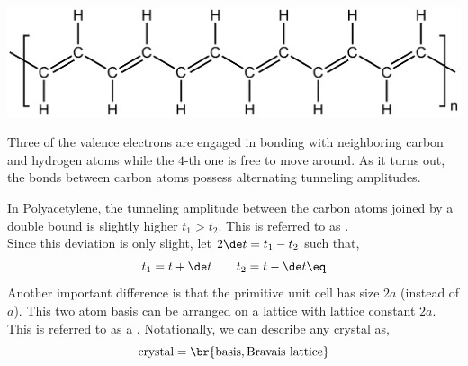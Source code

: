\documentclass{article}
\begin{document}
\begin{center}
    \includegraphics[width=\linewidth]{figures/polyacetylene.png}
\end{center}

Three of the valence electrons are engaged in bonding with neighboring carbon and hydrogen atoms while the $4$-th one is free to move around. As it turns out, the bonds between carbon atoms possess alternating tunneling amplitudes.

\begin{center}
\end{center}

In Polyacetylene, the tunneling amplitude between the carbon atoms joined by a double bound is slightly higher $t_1 > t_2$. This is referred to as . \\

Since this deviation is only slight, let $2\de t = t_1 - t_2$ such that,
\[ t_1 = t + \de t \qquad t_2 = t - \de t \eq \label{eq:t1t2}\]
Another important difference is that the primitive unit cell has size $2a$ (instead of $a$). This two atom basis can be arranged on a lattice with lattice constant $2a$. This is referred to as a . Notationally, we can describe any crystal as,
\[ \text{crystal} = \br{\text{basis}, \text{Bravais lattice}} \]
\end{document}
